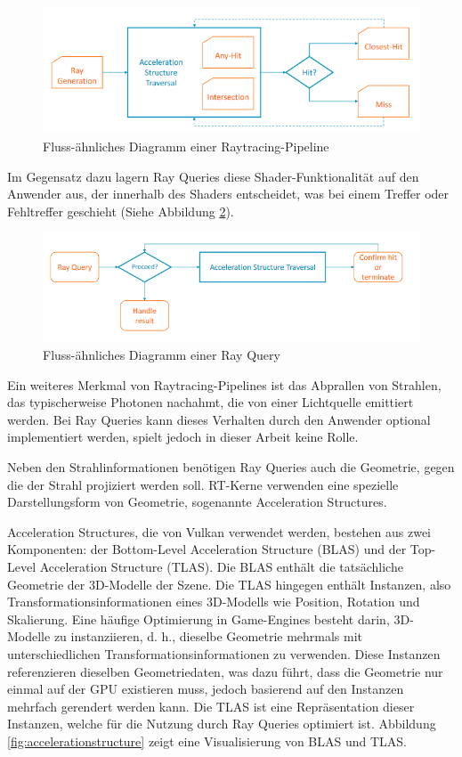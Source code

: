 \documentclass[11pt]{scrartcl}
\begin{document}
{	\begin{figure}[h]
		\centering
		\label{fig:fullrtpap}
		\includegraphics[width=0.7\linewidth]{Figures/full_rt_pap}
		\caption[Fluss-ähnliches Diagramm einer Raytracing-Pipeline]{Fluss-ähnliches Diagramm einer Raytracing-Pipeline\cite{Vulkanised2023}}
	\end{figure}
	
	Im Gegensatz dazu lagern Ray Queries diese Shader-Funktionalität auf den Anwender aus, der innerhalb des Shaders entscheidet, was bei einem Treffer oder Fehltreffer geschieht (Siehe Abbildung \ref{fig:rayquerypap}).
	
	\begin{figure}[h]
		\centering
		\label{fig:rayquerypap}
		\includegraphics[width=0.7\linewidth]{Figures/rayquery_pap}
		\caption[Fluss-ähnliches Diagramm einer Ray Query]{Fluss-ähnliches Diagramm einer Ray Query\cite{Vulkanised2023}}
	\end{figure}
	
	Ein weiteres Merkmal von Raytracing-Pipelines ist das Abprallen von Strahlen, das typischerweise Photonen nachahmt, die von einer Lichtquelle emittiert werden. Bei Ray Queries kann dieses Verhalten durch den Anwender optional implementiert werden, spielt jedoch in dieser Arbeit keine Rolle.
	
	Neben den Strahlinformationen benötigen Ray Queries auch die Geometrie, gegen die der Strahl projiziert werden soll. RT-Kerne verwenden eine spezielle Darstellungsform von Geometrie, sogenannte Acceleration Structures.
	
	Acceleration Structures, die von Vulkan verwendet werden, bestehen aus zwei Komponenten: der Bottom-Level Acceleration Structure (BLAS) und der Top-Level Acceleration Structure (TLAS)\cite{VulkanAccelerationStructures}. Die BLAS enthält die tatsächliche Geometrie der 3D-Modelle der Szene. Die TLAS hingegen enthält Instanzen, also Transformationsinformationen eines 3D-Modells wie Position, Rotation und Skalierung. Eine häufige Optimierung in Game-Engines besteht darin, 3D-Modelle zu instanziieren, d. h., dieselbe Geometrie mehrmals mit unterschiedlichen Transformationsinformationen zu verwenden. Diese Instanzen referenzieren dieselben Geometriedaten, was dazu führt, dass die Geometrie nur einmal auf der GPU existieren muss, jedoch basierend auf den Instanzen mehrfach gerendert werden kann. Die TLAS ist eine Repräsentation dieser Instanzen, welche für die Nutzung durch Ray Queries optimiert ist. Abbildung \ref{fig:accelerationstructure} zeigt eine Visualisierung von BLAS und TLAS.
	
}
\end{document}
